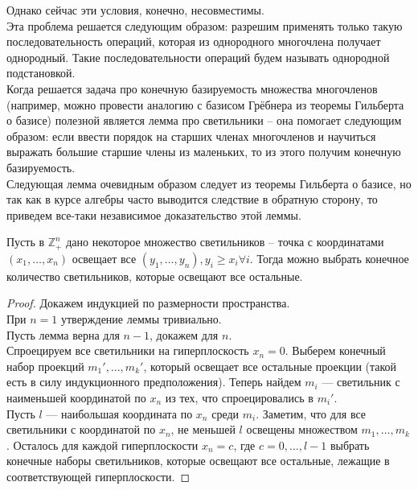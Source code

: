 Однако сейчас эти условия, конечно, несовместимы.\\
Эта проблема решается следующим образом: разрешим применять только такую последовательность операций, которая из однородного многочлена получает однородный.
Такие последовательности операций будем называть однородной подстановкой.\\
Когда решается задача про конечную базируемость множества многочленов (например, можно провести аналогию с базисом Грёбнера из теоремы Гильберта о базисе) полезной является лемма про светильники -- она помогает следующим образом: если ввести порядок на старших членах многочленов и научиться выражать большие старшие члены из маленьких, то из этого получим конечную базируемость.\\
Следующая лемма очевидным образом следует из теоремы Гильберта о базисе, но так как в курсе алгебры часто выводится следствие в обратную сторону, то приведем все-таки независимое доказательство этой леммы.\vskip 0.1in\noindent
\begin{lemma}
    \label{lamp}
    Пусть в $\mathbb{Z}_+^n$ дано некоторое множество светильников -- точка с координатами $(x_1,\ldots,x_n)$ освещает все $(y_1,\ldots,y_n), y_i\geq x_i \forall i$.
    Тогда можно выбрать конечное количество светильников, которые освещают все остальные.
\end{lemma}
\begin{proof}
    Докажем индукцией по размерности пространства.\\
    При $n=1$ утверждение леммы тривиально.\\
    Пусть лемма верна для $n-1$, докажем для $n$. \\
    Спроецируем все светильники на гиперплоскость $x_n=0$.
    Выберем конечный набор проекций $m_1',\ldots,m_k'$, который освещает все остальные проекции (такой есть в силу индукционного предположения).
    Теперь найдем $m_i$ --- светильник с наименьшей координатой по $x_n$ из тех, что спроецировались в $m_i'$.\\
    Пусть $l$ --- наибольшая координата по $x_n$ среди $m_i$.
    Заметим, что для все светильники с координатой по $x_n$, не меньшей $l$ освещены множеством $m_1,\ldots,m_k$.
    Осталось для каждой гиперплоскости $x_n=c$, где $c=0,\ldots,l-1$ выбрать конечные наборы светильников, которые освещают все остальные, лежащие в соответствующей гиперплоскости.
\end{proof}

